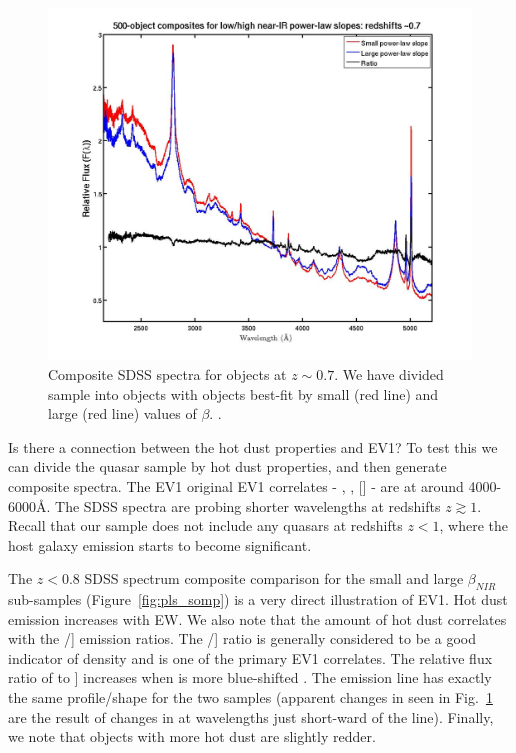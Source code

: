 \begin{figure}
  \centering
  \includegraphics[width=\textwidth]{figures/chapter05/z07_pls_comps.jpg}
  \caption{Composite SDSS spectra for objects at $z\sim0.7$. We have divided sample into objects with objects best-fit by small (red line) and large (red line) values of $\beta$. .}
  \label{fig:pls_comp}
\end{figure}

Is there a connection between the hot dust properties and EV1? 
To test this we can divide the quasar sample by hot dust properties, and then generate composite spectra. 
The \ac{EV1} original EV1 correlates - , \hb, [] - are at around 4000-6000\AA. 
The \ac{SDSS} spectra are probing shorter wavelengths at redshifts $z\gtrsim1$.
Recall that our sample does not include any quasars at redshifts $z<1$, where the host galaxy emission starts to become significant. 

The $z < 0.8$ SDSS spectrum composite comparison for the small and large $\beta_{NIR}$ sub-samples (Figure~\ref{fig:pls_somp}) is a very direct illustration of EV1. 
Hot dust emission increases with  EW. 
We also note that the amount of hot dust correlates with the /] emission ratios. 
The /] ratio is generally considered to be a good indicator of density and is one of the primary EV1 correlates. 
The relative flux ratio of  to ] increases when  is more blue-shifted \citep{richards11}. 
The  emission line has exactly the same profile/shape for the two samples (apparent changes in  seen in Fig.~\ref{fig:pls_comp} are the result of changes in  at wavelengths just short-ward of the line). 
Finally, we note that objects with more hot dust are slightly redder.

